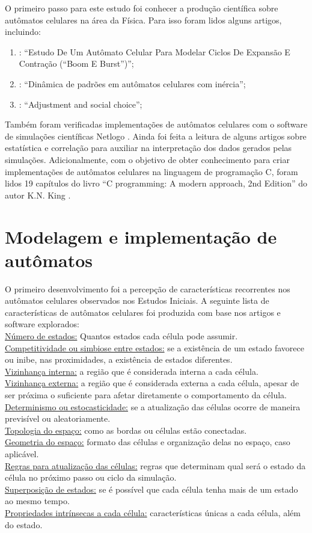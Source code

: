 \documentclass[
	12pt,				%
	openright,			%
	twoside,			%
	a4paper,			%
	english,			%
	french,				%
	spanish,			%
	brazil				%
	]{abntex2}
\begin{document}
O primeiro passo para este estudo foi conhecer a produção científica sobre autômatos celulares na área da Física. Para isso foram lidos alguns artigos, incluindo:
\begin{enumerate}
    \item {}: “Estudo De Um Autômato Celular Para Modelar Ciclos De Expansão E Contração (“Boom E Burst”)”;
    \item {}: “Dinâmica de padrões em autômatos celulares com inércia”;
    \item {}: “Adjustment and social choice”;
\end{enumerate}
Também foram verificadas implementações de autômatos celulares  com o software de simulações científicas Netlogo \cite{netlogo}. Ainda foi feita a leitura de alguns artigos sobre estatística \cite{statistics} e correlação para auxiliar na interpretação dos dados gerados pelas simulações. Adicionalmente, com o objetivo de obter conhecimento para criar implementações de autômatos celulares na linguagem de programação C, foram  lidos 19 capítulos do livro “C programming: A modern approach, 2nd Edition” do autor K.N. King \cite{king}.
    
\section{Modelagem e implementação de autômatos}

O primeiro desenvolvimento foi a percepção de características recorrentes nos autômatos celulares observados nos Estudos Iniciais.
A seguinte lista de características de autômatos celulares foi produzida com base nos artigos e software explorados:\\
\underline{Número de estados:} Quantos estados cada célula pode assumir.\\
\underline{Competitividade ou simbiose entre estados:} se a existência de um estado favorece ou inibe, nas proximidades, a existência de estados diferentes.\\
\underline{Vizinhança interna:} a região que é considerada interna a cada célula.\\
\underline{Vizinhança externa:} a região que é considerada externa a cada célula, apesar de ser próxima o suficiente para afetar diretamente o comportamento da célula.\\
\underline{Determinismo ou estocasticidade:} se a atualização das células ocorre de maneira previsível ou aleatoriamente.\\
\underline{Topologia do espaço:} como as bordas ou células estão conectadas.\\
\underline{Geometria do espaço:} formato das células e organização delas no espaço, caso aplicável.\\
\underline{Regras para atualização das células:} regras que determinam qual será o estado da célula no próximo passo ou ciclo da simulação.\\
\underline{Superposição de estados:} se é possível que cada célula tenha mais de um estado ao mesmo tempo.\\
\underline{Propriedades intrínsecas a cada célula:} características únicas a cada célula, além do estado.
\end{document}
